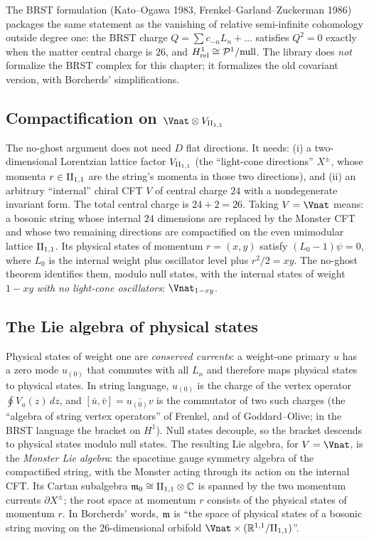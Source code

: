 The BRST formulation (Kato--Ogawa 1983, Frenkel--Garland--Zuckerman 1986) packages the same statement
as the vanishing of relative semi-infinite cohomology outside degree one: the BRST charge
$Q=\sum c_{-n}L_n+\dots$ satisfies $Q^2=0$ exactly when the matter central charge is $26$, and
$H^1_{\mathrm{rel}}\cong\mathcal{P}^1/\text{null}$.  The library does \emph{not} formalize the BRST complex
for this chapter; it formalizes the old covariant version, with Borcherds' simplifications.

\subsection{\texorpdfstring{Compactification on $\Vnat\otimes V_{\chXVIIIII}$}{Compactification on V-natural tensor V(II11)}}

The no-ghost argument does not need $D$ flat directions.  It needs: (i) a two-dimensional
Lorentzian lattice factor $V_{\mathrm{II}_{1,1}}$ (the ``light-cone directions'' $X^\pm$, whose momenta $r\in\mathrm{II}_{1,1}$
are the string's momenta in those two directions), and (ii) an arbitrary ``internal'' chiral CFT $V$ of
central charge $24$ with a nondegenerate invariant form.  The total central charge is $24+2=26$.  Taking
$V=\Vnat$ means: a bosonic string whose internal $24$ dimensions are replaced by the Monster CFT and
whose two remaining directions are compactified on the even unimodular lattice $\mathrm{II}_{1,1}$.  Its
physical states of momentum $r=(x,y)$ satisfy $(L_0-1)\psi=0$, where $L_0$ is the internal weight plus
oscillator level plus $r^2/2=xy$.  The no-ghost theorem identifies them, modulo null states, with the
internal states of weight $1-xy$ \emph{with no light-cone oscillators}: $\Vnat_{1-xy}$.

\subsection{The Lie algebra of physical states}

Physical states of weight one are \emph{conserved currents}: a weight-one primary $u$ has a zero mode
$u_{(0)}$ that commutes with all $L_n$ and therefore maps physical states to physical states.  In
string language, $u_{(0)}$ is the charge of the vertex operator $\oint V_u(z)\,dz$, and $[\bar u,\bar
v]=\overline{u_{(0)}v}$ is the commutator of two such charges (the ``algebra of string vertex
operators'' of Frenkel, and of Goddard--Olive; in the BRST language the bracket on $H^1$).  Null
states decouple, so the bracket descends to physical states modulo null states.  The resulting Lie
algebra, for $V=\Vnat$, is the \emph{Monster Lie algebra}: the spacetime gauge symmetry algebra of the
compactified string, with the Monster acting through its action on the internal CFT.  Its Cartan
subalgebra $\mathfrak{m}_0\cong\mathrm{II}_{1,1}\otimes\mathbb C$ is spanned by the two momentum currents
$\partial X^\pm$; the root space at momentum $r$ consists of the physical states of momentum $r$.  In
Borcherds' words, $\mathfrak{m}$ is ``the space of physical states of a bosonic string moving on the
$26$-dimensional orbifold $\Vnat\times(\mathbb R^{1,1}/\chXVIIIII)$''.

